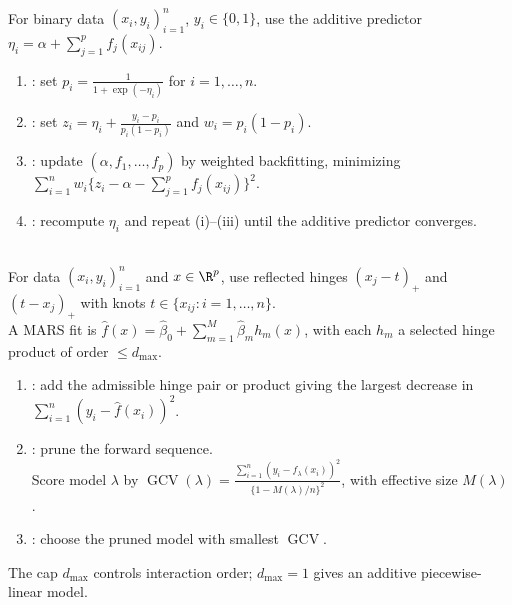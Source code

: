 \begin{method} \label{meth:sl-local-scoring-additive-logistic} \\
For binary data $(x_i,y_i)_{i=1}^n$, $y_i\in\{0,1\}$, use the additive predictor $\eta_i=\alpha+\sum\limits_{j=1}^p f_j(x_{ij})$.
\begin{enumerate}[label=(\roman*)]
\setlength{\itemsep}{0pt}
\item {}: set $p_i=\frac{1}{1+\exp(-\eta_i)}$ for $i=1,\ldots,n$.
\item {}: set $z_i=\eta_i+\frac{y_i-p_i}{p_i(1-p_i)}$ and $w_i=p_i(1-p_i)$.
\item {}: update $(\alpha,f_1,\ldots,f_p)$ by weighted backfitting, minimizing $\sum\limits_{i=1}^n w_i\{z_i-\alpha-\sum\limits_{j=1}^p f_j(x_{ij})\}^2$.
\item {}: recompute $\eta_i$ and repeat (i)--(iii) until the additive predictor converges.
\end{enumerate}
\end{method}

\begin{method} \label{meth:sl-mars-adaptive-basis} \\
For data $(x_i,y_i)_{i=1}^n$ and $x\in\R^p$, use reflected hinges $(x_j-t)_+$ and $(t-x_j)_+$ with knots $t\in\{x_{ij}:i=1,\ldots,n\}$.\\
A MARS fit is $\widehat{f}(x)=\widehat{\beta}_0+\sum\limits_{m=1}^M\widehat{\beta}_m h_m(x)$, with each $h_m$ a selected hinge product of order $\le d_{\max}$.
\begin{enumerate}[label=(\roman*)]
\setlength{\itemsep}{0pt}
\item {}: add the admissible hinge pair or product giving the largest decrease in $\sum\limits_{i=1}^n(y_i-\widehat{f}(x_i))^2$.
\item {}: prune the forward sequence.\\
Score model $\lambda$ by $\operatorname{GCV}(\lambda)=\frac{\sum\limits_{i=1}^n(y_i-\widehat{f}_\lambda(x_i))^2}{\{1-M(\lambda)/n\}^2}$, with effective size $M(\lambda)$.
\item {}: choose the pruned model with smallest $\operatorname{GCV}$.
\end{enumerate}
The cap $d_{\max}$ controls interaction order; $d_{\max}=1$ gives an additive piecewise-linear model.
\end{method}

